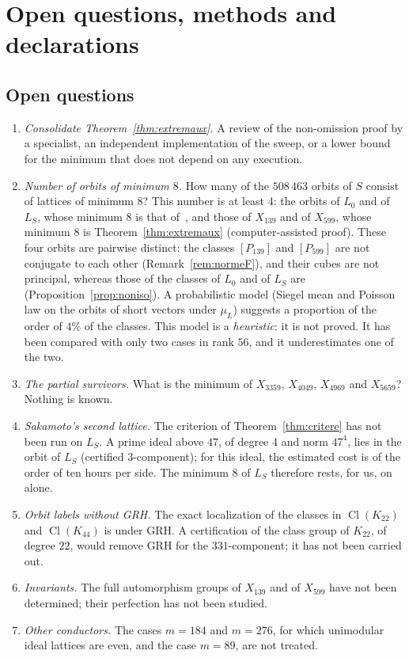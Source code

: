 \documentclass[11pt,a4paper]{amsart}
\theoremstyle{plain}
\theoremstyle{definition}
\numberwithin{equation}{section}
\DeclareMathOperator{\Cl}{Cl}
\newcommand{\Lz}{L_{0}}
\newcommand{\LS}{L_{S}}
\begin{document}
\section{Open questions, methods and declarations}\label{sec:fin}

\subsection{Open questions}\label{subsec:questions}

\begin{enumerate}[label=\textup{(Q\arabic*)}]
\item \emph{Consolidate Theorem~\ref{thm:extremaux}.} A review of the non-omission proof by a specialist, an independent implementation of the sweep, or a lower bound for the minimum that does not depend on any execution.
\item \emph{Number of orbits of minimum $8$.} How many of the $508\,463$ orbits of $S$ consist of lattices of minimum $8$? This number is at least $4$: the orbits of $\Lz$ and of $\LS$, whose minimum $8$ is that of~\cite{Sak26}, and those of $X_{139}$ and of $X_{599}$, whose minimum $8$ is Theorem~\ref{thm:extremaux} (computer-assisted proof). These four orbits are pairwise distinct: the classes $[P_{139}]$ and $[P_{599}]$ are not conjugate to each other (Remark~\ref{rem:normeF}), and their cubes are not principal, whereas those of the classes of $\Lz$ and of $\LS$ are (Proposition~\ref{prop:noniso}). A probabilistic model (Siegel mean and Poisson law on the orbits of short vectors under $\mu_L$) suggests a proportion of the order of $4\%$ of the classes. This model is a \emph{heuristic}: it is not proved. It has been compared with only two cases in rank $56$, and it underestimates one of the two.
\item \emph{The partial survivors.} What is the minimum of $X_{3359}$, $X_{4049}$, $X_{4969}$ and $X_{5659}$? Nothing is known.
\item \emph{Sakamoto's second lattice.} The criterion of Theorem~\ref{thm:critere} has not been run on $\LS$. A prime ideal above $47$, of degree $4$ and norm $47^4$, lies in the orbit of $\LS$ (certified $3$-component); for this ideal, the estimated cost is of the order of ten hours per side. The minimum $8$ of $\LS$ therefore rests, for us, on~\cite{Sak26} alone.
\item \emph{Orbit labels without GRH.} The exact localization of the classes in $\Cl(K_{22})$ and $\Cl(K_{44})$ is under GRH. A certification of the class group of $K_{22}$, of degree $22$, would remove GRH for the $331$-component; it has not been carried out.
\item \emph{Invariants.} The full automorphism groups of
$X_{139}$ and of $X_{599}$ have not been determined;
their perfection has not been studied.
\item \emph{Other conductors.} The cases $m=184$ and $m=276$, for which unimodular ideal lattices are even, and the case $m=89$, are not treated.
\end{enumerate}
\end{document}
